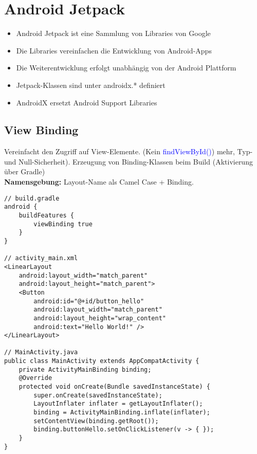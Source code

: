 
\section{Android Jetpack}
\begin{itemize}[topsep=0pt, leftmargin=4mm]
    \setlength\itemsep{-0.3em}
    \item Android Jetpack ist eine Sammlung von Libraries von Google
    \item Die Libraries vereinfachen die Entwicklung von Android-Apps
    \item Die Weiterentwicklung erfolgt unabhängig von der Android Plattform
    \item Jetpack-Klassen sind unter androidx.* definiert
    \item AndroidX ersetzt Android Support Libraries
\end{itemize}
\subsection{View Binding}
Vereinfacht den Zugriff auf View-Elemente. (Kein \textcolor{blue}{findViewById()}) mehr, Typ- und Null-Sicherheit). Erzeugung von Binding-Klassen beim Build (Aktivierung über Gradle)\\
\textbf{Namensgebung:} Layout-Name als Camel Case + Binding.
\begin{lstlisting}
// build.gradle
android {
    buildFeatures {
        viewBinding true
    }
}

// activity_main.xml
<LinearLayout
    android:layout_width="match_parent"
    android:layout_height="match_parent">
    <Button
        android:id="@+id/button_hello"
        android:layout_width="match_parent"
        android:layout_height="wrap_content"
        android:text="Hello World!" />
</LinearLayout>

// MainActivity.java
public class MainActivity extends AppCompatActivity {
    private ActivityMainBinding binding;
    @Override
    protected void onCreate(Bundle savedInstanceState) {
        super.onCreate(savedInstanceState);
        LayoutInflater inflater = getLayoutInflater();
        binding = ActivityMainBinding.inflate(inflater);
        setContentView(binding.getRoot());
        binding.buttonHello.setOnClickListener(v -> { });
    }
}
\end{lstlisting}
